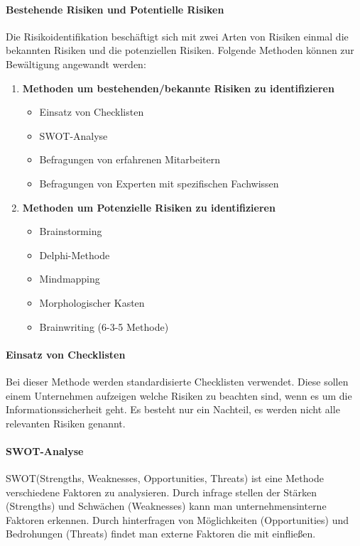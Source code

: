 \documentclass[12pt, oneside]{article}
\begin{document}
\paragraph{Bestehende Risiken und Potentielle Risiken}
Die Risikoidentifikation beschäftigt sich mit zwei Arten von Risiken einmal die bekannten Risiken und die potenziellen Risiken. Folgende Methoden können zur Bewältigung angewandt werden:
\begin{enumerate}
    \item \textbf{Methoden um bestehenden/bekannte Risiken zu identifizieren}
    \begin{itemize}
        \item Einsatz von Checklisten
        \item SWOT-Analyse
        \item Befragungen von erfahrenen Mitarbeitern
        \item Befragungen von Experten mit spezifischen Fachwissen
    \end{itemize}
    \item \textbf{Methoden um Potenzielle Risiken zu identifizieren}
    \begin{itemize}
    	\item Brainstorming
    	\item Delphi-Methode
    	\item Mindmapping
    	\item Morphologischer Kasten
    	\item Brainwriting (6-3-5 Methode)
    \end{itemize}
\end{enumerate}

\paragraph{Einsatz von Checklisten}
Bei dieser Methode werden standardisierte Checklisten verwendet. Diese sollen einem Unternehmen aufzeigen welche Risiken zu beachten sind, wenn es um die Informationssicherheit geht. Es besteht nur ein Nachteil, es werden nicht alle relevanten Risiken genannt.

\paragraph{SWOT-Analyse}
SWOT(Strengths, Weaknesses, Opportunities, Threats) ist eine Methode verschiedene Faktoren zu analysieren. Durch infrage stellen der Stärken (Strengths) und Schwächen (Weaknesses) kann man unternehmensinterne Faktoren erkennen. Durch hinterfragen von Möglichkeiten (Opportunities) und Bedrohungen (Threats) findet man externe Faktoren die mit einfließen.
\end{document}

